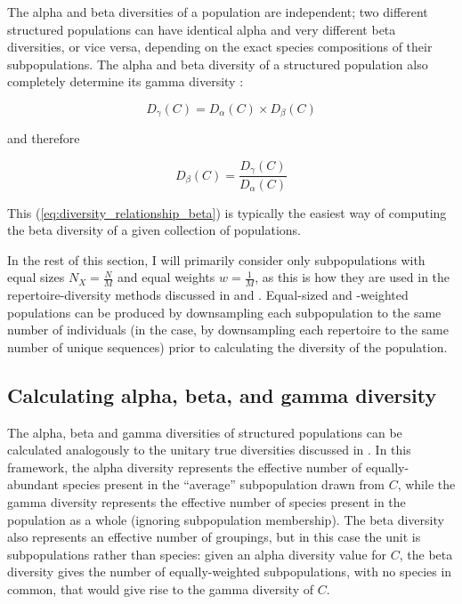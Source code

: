 \noindent The alpha and beta diversities of a population are independent; two different structured populations can have identical alpha and very different beta diversities, or vice versa, depending on the exact species compositions of their subpopulations. The alpha and beta diversity of a structured population also completely determine its gamma diversity \citep{jost2007partitioning}:

\begin{equation}
D_\gamma(C) = D_\alpha(C) \times D_\beta(C)
\label{eq:diversity_relationship_gamma}
\end{equation}

\noindent and therefore 

\begin{equation}
D_\beta(C) = \frac{D_\gamma(C)}{D_\alpha(C)}
\label{eq:diversity_relationship_beta}
\end{equation}

\noindent This (\autoref{eq:diversity_relationship_beta}) is typically the easiest way of computing the beta diversity of a given collection of populations.

In the rest of this section, I will primarily consider only subpopulations with equal sizes $N_X = \frac{N}{M}$ and equal weights $w = \frac{1}{M}$, as this is how they are used in the repertoire-diversity methods discussed in  and . Equal-sized and -weighted populations can be produced by downsampling each subpopulation to the same number of individuals (in the \igseq case, by downsampling each repertoire to the same number of unique sequences) prior to calculating the diversity of the population.
 
\subsection{Calculating alpha, beta, and gamma diversity}
\label{app:diversity-structured-calc}

The alpha, beta and gamma diversities of structured populations can be calculated analogously to the unitary true diversities discussed in . In this framework, the alpha diversity represents the effective number of equally-abundant species present in the ``average'' subpopulation drawn from $C$, while the gamma diversity represents the effective number of species present in the population as a whole (ignoring subpopulation membership). The beta diversity also represents an effective number of groupings, but in this case the unit is subpopulations rather than species: given an alpha diversity value for $C$, the beta diversity gives the number of equally-weighted subpopulations, with no species in common, that would give rise to the gamma diversity of $C$.


